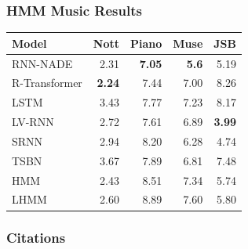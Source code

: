 \documentclass{beamer}
\begin{document}
\begin{frame}
\frametitle{HMM Music Results}
\centering
\begin{tabular}{lrrrr}
\toprule
Model       & Nott & Piano & Muse & JSB \\
\midrule
RNN-NADE & 2.31  & \textbf{7.05}        & \textbf{5.6}        & 5.19          \\
R-Transformer & \textbf{2.24} & 7.44 & 7.00 & 8.26 \\
LSTM  & 3.43 & 7.77   & 7.23 & 8.17     \\
LV-RNN    & 2.72       & 7.61        & 6.89       &\textbf{ 3.99}\\
SRNN     & 2.94       & 8.20         & 6.28       & 4.74          \\
\midrule
TSBN     & 3.67       & 7.89        & 6.81       & 7.48          \\
HMM &  2.43 & 8.51 & 7.34 & 5.74 \\
LHMM & 2.60 & 8.89 & 7.60 & 5.80 \\
\bottomrule
\end{tabular}
\end{frame}


\begin{frame}
\frametitle{Citations}
\printbibliography
\end{frame}
\end{document}
